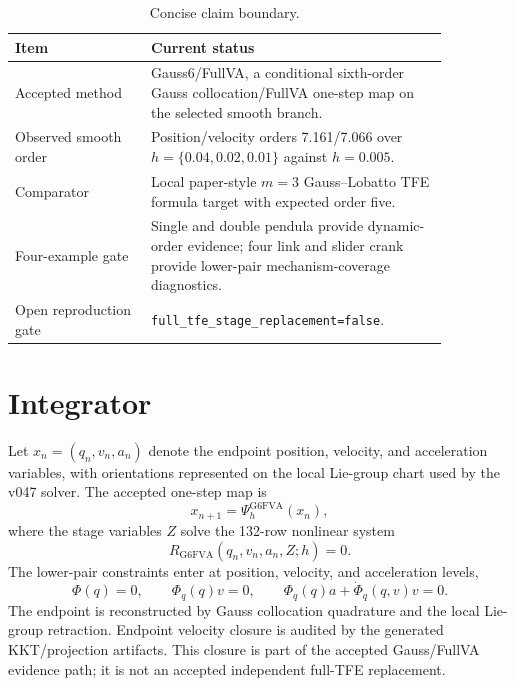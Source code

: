\documentclass[11pt]{article}
\newcommand{\method}{Gauss6\slash FullVA}
\newcommand{\tfe}{TFE}
\begin{document}
\begin{table}[htbp]
\centering
\caption{Concise claim boundary.}
\label{tab:claim-boundary}
\begin{tabular}{P{0.27\linewidth}P{0.59\linewidth}}
\toprule
Item & Current status \\
\midrule
Accepted method &
\method{}, a conditional sixth-order Gauss collocation/FullVA one-step map on
the selected smooth branch. \\
Observed smooth order &
Position/velocity orders 7.161/7.066 over
$h=\{0.04,0.02,0.01\}$ against $h=0.005$. \\
Comparator &
Local paper-style $m=3$ Gauss--Lobatto \tfe{} formula target with expected
order five. \\
Four-example gate &
Single and double pendula provide dynamic-order evidence; four link and slider
crank provide lower-pair mechanism-coverage diagnostics. \\
Open reproduction gate &
\nolinkurl{full_tfe_stage_replacement=false}. \\
\bottomrule
\end{tabular}
\end{table}

\section{Integrator}

Let $x_n=(q_n,v_n,a_n)$ denote the endpoint position, velocity, and
acceleration variables, with orientations represented on the local Lie-group
chart used by the v047 solver.  The accepted one-step map is
\begin{equation}
  x_{n+1}=\Psi_h^{\mathrm{G6FVA}}(x_n),
\end{equation}
where the stage variables $Z$ solve the 132-row nonlinear system
\begin{equation}
  R_{\mathrm{G6FVA}}(q_n,v_n,a_n,Z;h)=0.
\end{equation}
The lower-pair constraints enter at position, velocity, and acceleration
levels,
\begin{equation}
  \Phi(q)=0,\qquad
  \Phi_q(q)v=0,\qquad
  \Phi_q(q)a+\dot{\Phi}_q(q,v)v=0.
\end{equation}
The endpoint is reconstructed by Gauss collocation quadrature and the local
Lie-group retraction.  Endpoint velocity closure is audited by the generated
KKT/projection artifacts.  This closure is part of the accepted Gauss/FullVA
evidence path; it is not an accepted independent full-\tfe{} replacement.
\end{document}
